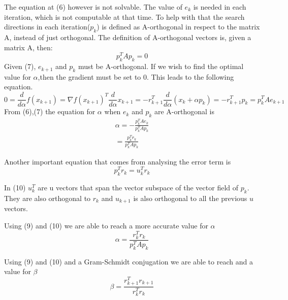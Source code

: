 \documentclass[12pt,a4paper]{article}
\begin{document}
The equation at (6) however is not solvable. The value of $e_k$ is needed in each iteration, which is not computable at that time. To help with that the search directions in each iteration($p_k$) is defined as A-orthogonal in respect to the matrix A, instead of just orthogonal. The definition of A-orthogonal vectors is, given a matrix A, then:
\begin{equation}
p^T_kAp_k=0
\end{equation}
Given (7), $e_{k+1}$ and $p_k$ must be A-orthogonal. If we wish to find the optimal value for $\alpha$,then the gradient must be set to 0. This leads to the following equation.
\begin{equation}
0=\frac{d}{d\alpha}f(x_{k+1})=\nabla f(x_{k+1})^T\frac{d}{d\alpha}x_{k+1} = -r^T_{k+1}\frac{d}{d\alpha}(x_k + \alpha p_k) = -r^T_{k+1}p_k=p^T_kAe_{k+1}
\end{equation}
From (6),(7) the equation for $\alpha$ when $e_k$ and $p_k$ are A-orthogonal is
\begin{equation}
\begin{split}
\alpha =-\frac{p^T_kAe_k}{p^T_kAp_k}\\
=\frac{p^T_kr_k}{p^T_kAp_k}
\end{split}
\end{equation}

Another important equation that comes from analysing the error term is
\begin{equation}
p^T_kr_k=u^T_kr_k
\end{equation}

In (10) $u^T_k$ are u vectors that span the vector subspace of the vector field of $p_k$. They are also orthogonal to $r_k$ and $u_{k+1}$ is also orthogonal to all the previous $u$ vectors.

Using (9) and (10) we are able to reach a more accurate value for $\alpha$
\begin{equation}
\alpha = \frac{r^T_kr_k}{p^T_kAp_k}
\end{equation}

Using (9) and (10) and a Gram-Schmidt conjugation we are able to reach and a value for $\beta$
\begin{equation}
\beta = \frac{r^T_{k+1}r_{k+1}}{r^T_kr_k}
\end{equation}
\newpage\cite{rast2012managing}
\end{document}
